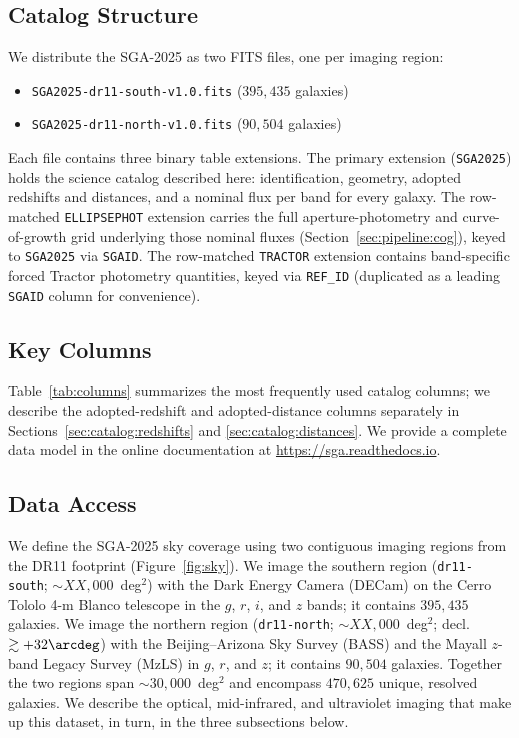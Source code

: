 \documentclass[modern,linenumbers]{aastex701}
\begin{document}
\subsection{Catalog Structure}
\label{sec:catalog:structure}

We distribute the SGA-2025 as two FITS files, one per imaging region:

\begin{itemize}
  \item \texttt{SGA2025-dr11-south-v1.0.fits} ($395{,}435$ galaxies)
  \item \texttt{SGA2025-dr11-north-v1.0.fits} ($90{,}504$ galaxies)
\end{itemize}

Each file contains three binary table extensions. The primary extension
(\texttt{SGA2025}) holds the science catalog described here: identification,
geometry, adopted redshifts and distances, and a nominal flux per band for
every galaxy. The row-matched \texttt{ELLIPSEPHOT} extension carries the
full aperture-photometry and curve-of-growth grid underlying those nominal
fluxes (Section~\ref{sec:pipeline:cog}), keyed to \texttt{SGA2025} via
\texttt{SGAID}. The row-matched \texttt{TRACTOR} extension contains
band-specific forced Tractor photometry quantities, keyed via
\texttt{REF\_ID} (duplicated as a leading \texttt{SGAID} column for
convenience).

\subsection{Key Columns}
\label{sec:catalog:columns}

Table~\ref{tab:columns} summarizes the most frequently used catalog
columns; we describe the adopted-redshift and adopted-distance columns
separately in Sections~\ref{sec:catalog:redshifts} and
\ref{sec:catalog:distances}. We provide a complete data model in the
online documentation at \url{https://sga.readthedocs.io}.

% 

\subsection{Data Access}
\label{sec:catalog:access}

We define the SGA-2025 sky coverage using two contiguous imaging regions
from the DR11 footprint (Figure~\ref{fig:sky}). We image the southern
region (\texttt{dr11-south}; $\sim\!XX{,}000$~deg$^2$) with the Dark
Energy Camera (DECam) on the Cerro Tololo 4-m Blanco telescope in the
$g$, $r$, $i$, and $z$ bands; it contains $395{,}435$ galaxies.
We image the northern region (\texttt{dr11-north};
$\sim\!XX{,}000$~deg$^2$; decl.\ $\gtrsim +32\arcdeg$) with the
Beijing--Arizona Sky Survey (BASS) and the Mayall $z$-band Legacy Survey
(MzLS) in $g$, $r$, and $z$; it contains $90{,}504$ galaxies.
Together the two regions span $\sim\!30{,}000$~deg$^2$ and encompass
$470{,}625$ unique, resolved galaxies. We describe the optical, mid-infrared,
and ultraviolet imaging that make up this dataset, in turn, in the three
subsections below.
\end{document}
